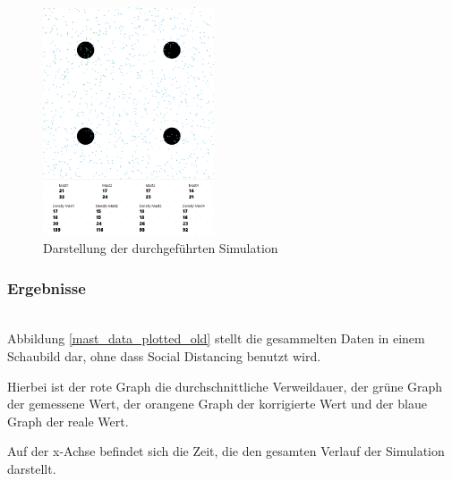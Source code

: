 \documentclass[conference,compsoc]{IEEEtran}
\begin{document}
\begin{figure}[h]
	\centering
	\includegraphics[width=0.45\textwidth]{"Simulation"}
	\caption{Darstellung der durchgeführten Simulation}
	\label{sim}
\end{figure}

\subsubsection{Ergebnisse}
\text{}\\
Abbildung \ref{mast_data_plotted_old} stellt die gesammelten Daten in einem Schaubild dar, ohne dass Social Distancing benutzt wird.

Hierbei ist der rote Graph die durchschnittliche Verweildauer, der grüne Graph der gemessene Wert, der orangene Graph der korrigierte Wert und der blaue Graph der reale Wert.

Auf der x-Achse befindet sich die Zeit, die den gesamten Verlauf der Simulation darstellt.
\end{document}
